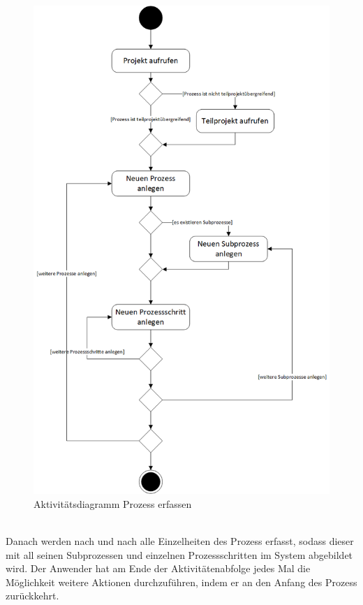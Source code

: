 \begin{figure}[h!]
    \centering
    \includegraphics[scale=0.67]{./Bilder/AD4_ProzessErfassen.png}
    \caption[Aktivitätsdiagramm Anwendungsfall 4]{Aktivitätsdiagramm Prozess erfassen}
    \label{fig:AD4}
\end{figure}
\\Danach werden nach und nach alle Einzelheiten des Prozess erfasst, sodass dieser mit all seinen Subprozessen und einzelnen Prozessschritten im System abgebildet wird. Der Anwender hat am Ende der Aktivitätenabfolge jedes Mal die Möglichkeit weitere Aktionen durchzuführen, indem er an den Anfang des Prozess zurückkehrt.

